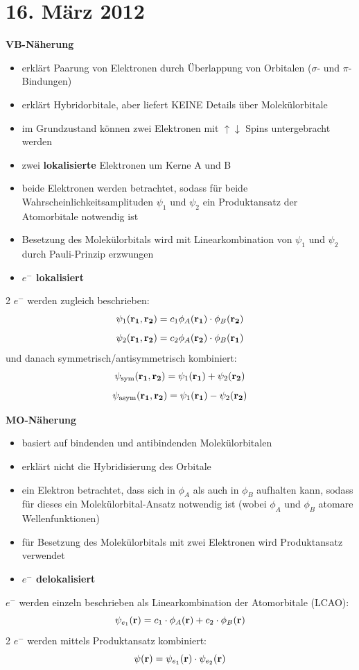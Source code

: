 \section{16. März 2012}

\label{q:41}

\textbf{VB-Näherung}
\begin{itemize}  
    \item erklärt Paarung von Elektronen durch Überlappung von Orbitalen ($\sigma$- und $\pi$-Bindungen)
    \item erklärt Hybridorbitale, aber liefert KEINE Details über Molekülorbitale
    \item im Grundzustand können zwei Elektronen mit $\uparrow \downarrow$ Spins untergebracht werden
    \item zwei \textbf{lokalisierte} Elektronen um Kerne A und B
    \item beide Elektronen werden betrachtet, sodass für beide Wahrscheinlichkeitsamplituden $\psi_1$ und $\psi_2$ ein Produktansatz der Atomorbitale notwendig ist
    \item Besetzung des Molekülorbitals wird mit Linearkombination von $\psi_1$ und $\psi_2$ durch Pauli-Prinzip erzwungen
    \item \textbf{$e^-$ lokalisiert}
\end{itemize}
2 $e^-$ werden zugleich beschrieben:
\[\psi_1(\vb{r_1},\vb{r_2}) = c_1 \phi_A(\vb{r_1}) \cdot \phi_B(\vb{r_2})\]
\[\psi_2(\vb{r_1},\vb{r_2}) = c_2 \phi_A(\vb{r_2}) \cdot \phi_B(\vb{r_1})\]
und danach symmetrisch/antisymmetrisch kombiniert: 
\[\psi_{\text{sym}} (\vb{r_1},\vb{r_2}) = \psi_1(\vb{r_1}) + \psi_2(\vb{r_2})\]
\[\psi_{\text{asym}}(\vb{r_1},\vb{r_2}) = \psi_1(\vb{r_1}) - \psi_2(\vb{r_2})\]

\noindent
\textbf{MO-Näherung}
\begin{itemize}
    \item basiert auf bindenden und antibindenden Molekülorbitalen
    \item erklärt nicht die Hybridisierung des Orbitale
    \item ein Elektron betrachtet, dass sich in $\phi_A$ als auch in $\phi_B$ aufhalten kann, sodass für dieses ein Molekülorbital-Ansatz notwendig ist (wobei $\phi_A$ und $\phi_B$ atomare Wellenfunktionen)
    \item für Besetzung des Molekülorbitals mit zwei Elektronen wird Produktansatz verwendet
    \item \textbf{$e^-$ delokalisiert}
\end{itemize}
$e^-$ werden einzeln beschrieben als Linearkombination der Atomorbitale (LCAO):
\[\psi_{e_1}(\vb{r}) = c_1 \cdot \phi_A(\vb{r}) +c_2 \cdot \phi_B(\vb{r})\]
2 $e^-$ werden mittels Produktansatz kombiniert:
\[\psi(\vb{r}) = \psi_{e_1}(\vb{r}) \cdot \psi_{e_2}(\vb{r}) \]

